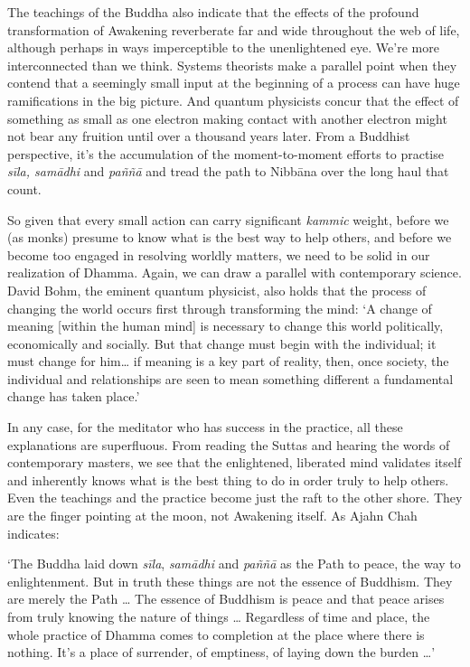 The teachings of the Buddha also indicate that the effects of the
profound transformation of Awakening reverberate far and wide throughout
the web of life, although perhaps in ways imperceptible to the
unenlightened eye. We're more interconnected than we think. Systems
theorists make a parallel point when they contend that a seemingly small
input at the beginning of a process can have huge ramifications in the
big picture. And quantum physicists concur that the effect of something
as small as one electron making contact with another electron might not
bear any fruition until over a thousand years later. From a Buddhist
perspective, it's the accumulation of the moment-to-moment efforts to
practise \emph{sīla, samādhi} and \emph{paññā} and tread the path to
Nibbāna over the long haul that count. 

So given that every small action can carry significant \emph{kammic}
weight, before we (as monks) presume to know what is the best way to
help others, and before we become too engaged in resolving worldly
matters, we need to be solid in our realization of Dhamma. Again, we can
draw a parallel with contemporary science. David Bohm, the eminent
quantum physicist, also holds that the process of changing the world
occurs first through transforming the mind: `A change of meaning
[within the human mind] is necessary to change this world
politically, economically and socially. But that change must begin with
the individual; it must change for him\ldots{} if meaning is a key part
of reality, then, once society, the individual and relationships are
seen to mean something different a fundamental change has taken place.'

In any case, for the meditator who has success in the practice, all
these explanations are superfluous. From reading the Suttas and hearing
the words of contemporary masters, we see that the enlightened, 
liberated mind validates itself and inherently knows what is the best
thing to do in order truly to help others. Even the teachings and the
practice become just the raft to the other shore. They are the finger
pointing at the moon, not Awakening itself. As Ajahn Chah indicates: 

`The Buddha laid down \emph{sīla}, \emph{samādhi} and \emph{paññā} as
the Path to peace, the way to enlightenment. But in truth these things
are not the essence of Buddhism. They are merely the Path \ldots{} The
essence of Buddhism is peace and that peace arises from truly knowing
the nature of things \ldots{} Regardless of time and place, the whole
practice of Dhamma comes to completion at the place where there is
nothing. It's a place of surrender, of emptiness, of laying down the
burden \ldots{}'

